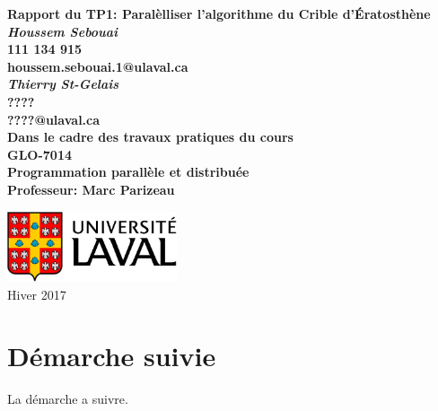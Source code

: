 \documentclass{report}
\begin{document}
\renewcommand{\labelitemi}{$\bullet$}
\thispagestyle{empty}

\begin{center}
	\vspace*{1cm}
	\huge  \bf Rapport du TP1: Paralèlliser l'algorithme du Crible d'Ératosthène\\
	\vspace{2.5cm}
	\normalsize
	\textit{Houssem Sebouai}\\
	111 134 915\\
	houssem.sebouai.1@ulaval.ca\\

  \vspace{1cm}
	\normalsize
	\textit{Thierry St-Gelais}\\
	????\\
	????@ulaval.ca\\

	\vspace{2cm}
	Dans le cadre des travaux pratiques du cours\\
	\LARGE GLO-7014\\
	\large Programmation parallèle et distribuée\\
	Professeur: Marc Parizeau

	\vfill
	\includegraphics[width=5cm]{Images/logo.jpg}
	\\
	Hiver 2017
\end{center}

\newpage

\tableofcontents
\listoffigures
\listoftables
\newpage
\section*{Démarche suivie}
La démarche a suivre.
\end{document}

